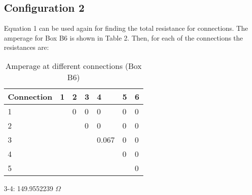 \documentclass [12pt, letterpaper, twoside] {article}
\begin{document}
\subsection* {Configuration 2}
Equation 1 can be used again for finding the total resistance for connections. The amperage for Box B6 is shown in Table 2. Then, for each of the connections the resistances are:

\begin {table}
  \centering
  \begin {tabular}{| l | l | l | l | l | l | l |}
    \hline\hline
    Connection & 1 & 2 & 3 & 4 & 5 & 6 \\
    \hline
    1 & & 0 & 0 & 0 & 0 & 0 \\
    \hline
    2 & & & 0 & 0 & 0 & 0 \\
    \hline
    3 & & & & 0.067 & 0 & 0 \\
    \hline
    4 & & & & & 0 & 0 \\
    \hline
    5 & & & & & & 0 \\
    \hline\hline
  \end {tabular}
  \caption {Amperage at different connections (Box B6)}
\end {table}

3-4: 149.9552239 \(\Omega\)
\end{document}
